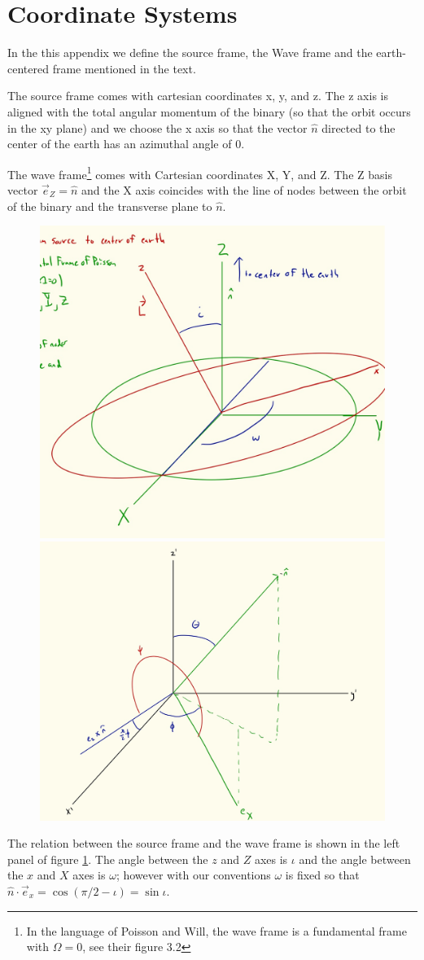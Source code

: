 \documentclass[aps,prd,amsmath,showpacs,amssymb,superscriptaddress,nofootinbib,longbibliography,eqsecnum,preprintnumbers]{revtex4-1}
\begin{document}
\appendix

\section{Coordinate Systems}
\label{sec:coor}

In the this appendix we define the source frame, the Wave frame and the earth-centered frame mentioned in the text.

The source frame comes with cartesian coordinates x, y, and z. The z axis is aligned with the  total angular momentum of the binary (so that the orbit occurs in the xy plane) and we choose the x axis so that the vector $\hat n$ directed to the center of the earth has an azimuthal angle of 0.

The wave frame\footnote{In the language of Poisson and Will, the wave frame is a fundamental frame with $\Omega =0$, see their figure 3.2} comes with Cartesian coordinates X, Y, and Z. The Z basis vector $\vec e_Z=\hat n$ and the X axis coincides with the line of nodes between the orbit of the binary and the transverse plane to $\hat n$.

\begin{figure}[t]
\includegraphics[width =0.45\columnwidth]{sw}
\includegraphics[width =0.5\columnwidth]{we}
\caption{
}
\label{fig:frames}
\end{figure}

The relation between the source frame and the wave frame is shown in the left panel of figure \ref{fig:frames}. The angle between the $z$ and $Z$ axes is $\iota$ and the angle between the $x$ and $X$ axes is $\omega$; however with our conventions $\omega$ is fixed so that $\hat n \cdot \vec e_x=\cos(\pi/2-\iota)=\sin \iota$.
\end{document}
